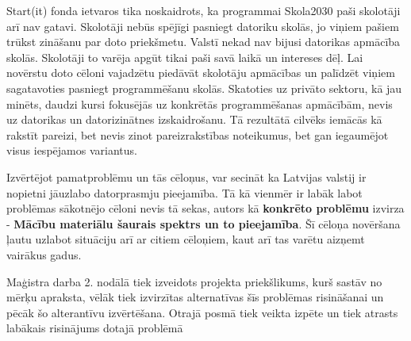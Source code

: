 \begin{enumerate}
Start(it) fonda ietvaros tika noskaidrots, ka programmai Skola2030 paši skolotāji arī nav gatavi. Skolotāji nebūs
spējīgi pasniegt datoriku skolās, jo viņiem pašiem trūkst zināšanu par doto priekšmetu. Valstī nekad nav bijusi 
datorikas apmācība skolās. Skolotāji to varēja apgūt tikai paši savā laikā un intereses dēļ. Lai novērstu
doto cēloni vajadzētu piedāvāt skolotāju apmācības un palīdzēt viņiem sagatavoties pasniegt programmēšanu skolās.
Skatoties uz privāto sektoru, kā jau minēts, daudzi kursi fokusējās uz konkrētās programmēšanas apmācībām, nevis
uz datorikas un datorizinātnes izskaidrošanu. Tā rezultātā cilvēks iemācās kā rakstīt pareizi, bet nevis zinot
pareizrakstības noteikumus, bet gan iegaumējot visus iespējamos variantus.
\end{enumerate}
\par
Izvērtējot pamatproblēmu un tās cēloņus, var secināt ka Latvijas valstij ir nopietni jāuzlabo datorprasmju 
pieejamība. Tā kā vienmēr ir labāk labot problēmas sākotnējo cēloni nevis tā sekas, autors
kā \textbf{konkrēto problēmu} izvirza - \textbf{Mācību materiālu šaurais spektrs un to pieejamība}.
Šī cēloņa novēršana ļautu uzlabot situāciju arī ar citiem cēloņiem, kaut arī tas varētu aizņemt vairākus gadus.
\par
Maģistra darba 2. nodālā tiek izveidots projekta priekšlikums, kurš sastāv no mērķu apraksta,
vēlāk tiek izvirzītas alternatīvas šīs problēmas risināšanai un pēcāk šo alterantīvu izvērtēšana.
Otrajā posmā tiek veikta izpēte un tiek atrasts labākais risinājums dotajā problēmā